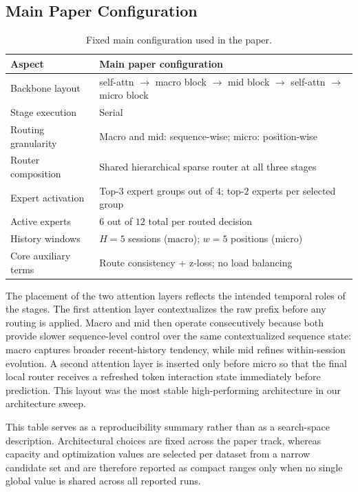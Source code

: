 \documentclass[sigconf,review,anonymous]{acmart}
\begin{document}
\subsection{Main Paper Configuration}

\begin{table}[H]
  \centering
  \caption{Fixed main configuration used in the paper.}
  \label{tab:appendix-main-setting}
  \footnotesize
  \setlength{\tabcolsep}{4pt}
  \renewcommand{\arraystretch}{1.07}
  \begin{tabularx}{\columnwidth}{@{}L{0.30\columnwidth}>{\raggedright\arraybackslash}X@{}}
    \toprule
    Aspect & Main paper configuration \\
    \midrule
    Backbone layout & self-attn $\to$ macro block $\to$ mid block $\to$ self-attn $\to$ micro block \\
    Stage execution & Serial \\
    Routing granularity & Macro and mid: sequence-wise; micro: position-wise \\
    Router composition & Shared hierarchical sparse router at all three stages \\
    Expert activation & Top-$3$ expert groups out of $4$; top-$2$ experts per selected group \\
    Active experts & $6$ out of $12$ total per routed decision \\
    History windows & $H=5$ sessions (macro); $w=5$ positions (micro) \\
    Core auxiliary terms & Route consistency + z-loss; no load balancing \\
    \bottomrule
  \end{tabularx}
\end{table}

The placement of the two attention layers reflects the intended temporal roles of the stages. The first attention layer contextualizes the raw prefix before any routing is applied. Macro and mid then operate consecutively because both provide slower sequence-level control over the same contextualized sequence state: macro captures broader recent-history tendency, while mid refines within-session evolution. A second attention layer is inserted only before micro so that the final local router receives a refreshed token interaction state immediately before prediction. This layout was the most stable high-performing architecture in our architecture sweep.

This table serves as a reproducibility summary rather than as a search-space description. Architectural choices are fixed across the paper track, whereas capacity and optimization values are selected per dataset from a narrow candidate set and are therefore reported as compact ranges only when no single global value is shared across all reported runs.
\end{document}
